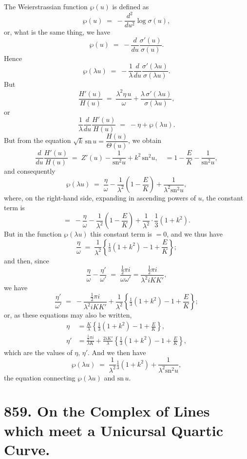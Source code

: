 \documentclass[11pt]{article}
\begin{document}
The Weierstrassian function $\wp(u)$ is defined as
\[
\wp(u) \;=\; -\frac{d^2}{du^2}\log\sigma(u),
\]
or, what is the same thing, we have
\[
\wp(u) \;=\; -\frac{d}{du}\frac{\sigma'(u)}{\sigma(u)}.
\]
Hence
\[
\wp(\lambda u) \;=\; -\frac{1}{\lambda}\frac{d}{du}\frac{\sigma'(\lambda u)}{\sigma(\lambda u)}.
\]
But
\[
\frac{H'(u)}{H(u)} \;=\; \frac{\lambda^2 \eta\, u}{\omega} + \frac{\lambda\,\sigma'(\lambda u)}{\sigma(\lambda u)},
\]
or
\[
\frac{1}{\lambda}\frac{d}{du}\frac{H'(u)}{H(u)} \;=\; -\eta + \wp(\lambda u).
\]
But from the equation $\sqrt{k}\,\mathrm{sn}\,u = \dfrac{H(u)}{\Theta(u)}$, we obtain
\[
\frac{d}{du}\frac{H'(u)}{H(u)} \;=\; Z'(u) - \frac{1}{\mathrm{sn}^2 u} + k^2\,\mathrm{sn}^2 u,\quad =1-\frac{E}{K} - \frac{1}{\mathrm{sn}^2 u},
\]
and consequently
\[
\wp(\lambda u) \;=\; \frac{\eta}{\omega} - \frac{1}{\lambda^2}\!\left(1-\frac{E}{K}\right) + \frac{1}{\lambda^2\mathrm{sn}^2 u},
\]
where, on the right-hand side, expanding in ascending powers of $u$, the constant term is
\[
=\; -\frac{\eta}{\omega} - \frac{1}{\lambda^2}\!\left(1-\frac{E}{K}\right) + \frac{1}{\lambda^2}\!\cdot\!\frac{1}{3}(1+k^2).
\]
But in the function $\wp(\lambda u)$ this constant term is $=0$, and we thus have
\[
\frac{\eta}{\omega} \;=\; \frac{1}{\lambda^2}\!\left\{\tfrac{1}{3}(1+k^2) - 1 + \frac{E}{K}\right\};
\]
and then, since
\[
\frac{\eta}{\omega} - \frac{\eta'}{\omega'} \;=\; \frac{\tfrac{1}{2}\pi i}{\omega\omega'} = \frac{\tfrac{1}{2}\pi i}{\lambda^2 i KK'},
\]
we have
\[
\frac{\eta'}{\omega'} \;=\; -\frac{\tfrac{1}{2}\pi i}{\lambda^2 i KK'} + \frac{1}{\lambda^2}\!\left\{\tfrac{1}{3}(1+k^2) - 1 + \frac{E}{K}\right\};
\]
or, as these equations may also be written,
\begin{align*}
\eta &= \frac{K}{\lambda}\!\left\{\tfrac{1}{3}(1+k^2) - 1 + \frac{E}{K}\right\},\\
\eta' &= \frac{\tfrac{1}{2}\pi i}{\lambda K} + \frac{2iK'}{\lambda}\!\left\{\tfrac{1}{3}(1+k^2) - 1 + \frac{E}{K}\right\},
\end{align*}
which are the values of $\eta$, $\eta'$. And we then have
\[
\wp(\lambda u) \;=\; \frac{1}{\lambda^2}\tfrac{1}{3}(1+k^2) + \frac{1}{\lambda^2\mathrm{sn}^2 u},
\]
the equation connecting $\wp(\lambda u)$ and $\mathrm{sn}\,u$.

\vfill

\newpage

\section*{859. On the Complex of Lines which meet a Unicursal Quartic Curve.}
\end{document}
